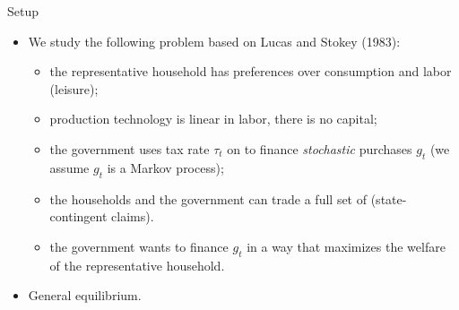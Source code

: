 \documentclass[11pt,xcolor={dvipsnames},aspectratio=159,hyperref={pdftex,pdfpagemode=UseNone,hidelinks,pdfdisplaydoctitle=true},usepdftitle=false]{beamer}
\begin{document}
            \begin{frame}
            \end{frame}
        
            \begin{frame}{Setup}
            \begin{itemize}
            \item We study the following problem based on Lucas and Stokey (1983):
            \begin{itemize}
            \item the representative household has preferences over consumption and labor (leisure);
            \item production technology is linear in labor, there is no capital;
            \item the government uses  tax rate $\tau_{t}$ on  to finance \emph{stochastic}
            purchases $g_{t}$ (we assume $g_{t}$ is a Markov process);
            \item the households and the government can trade a full set of  (state-contingent claims).
            \item the government wants to finance $g_{t}$ in a way that maximizes the welfare of the representative household.
            \end{itemize}
            \item General equilibrium.
            \end{itemize}
            \end{frame}
        
\end{document}
